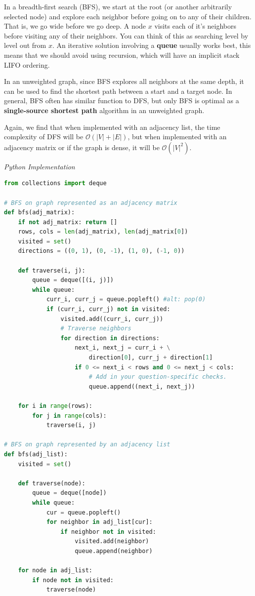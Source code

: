 \documentclass{article}
\newcommand{\bigO}{\mathcal{O}}
\begin{document}
    In a breadth-first search (BFS), we start at the root (or another arbitrarily selected node) and explore each neighbor before going on to any of their children. That is, we go wide before we go deep. A node $x$ visits each of it's neighbors before visiting any of their neighbors. You can think of this as searching level by level out from $x$. An iterative solution involving a \textbf{queue} usually works best, this means that we should avoid using recursion, which will have an implicit stack LIFO ordering.

    In an unweighted graph, since BFS explores all neighbors at the same depth, it can be used to find the shortest path between a start and a target node. In general, BFS often has similar function to DFS, but only BFS is optimal as a \textbf{single-source shortest path} algorithm in an unweighted graph.

    Again, we find that when implemented with an adjacency list, the time complexity of DFS will be $\bigO(|V| + |E|)$, but when implemented with an adjacency matrix or if the graph is dense, it will be $\bigO(|V|^2)$.
    
\vspace{8pt} \emph{Python Implementation}
\begin{lstlisting}[language=Python]
from collections import deque

# BFS on graph represented as an adjacency matrix
def bfs(adj_matrix):
    if not adj_matrix: return []
    rows, cols = len(adj_matrix), len(adj_matrix[0])
    visited = set()
    directions = ((0, 1), (0, -1), (1, 0), (-1, 0))

    def traverse(i, j):
        queue = deque([(i, j)])
        while queue:
            curr_i, curr_j = queue.popleft() #alt: pop(0)
            if (curr_i, curr_j) not in visited:
                visited.add((curr_i, curr_j))
                # Traverse neighbors
                for direction in directions:
                    next_i, next_j = curr_i + \
                        direction[0], curr_j + direction[1]
                    if 0 <= next_i < rows and 0 <= next_j < cols:
                        # Add in your question-specific checks.
                        queue.append((next_i, next_j))

    for i in range(rows):
        for j in range(cols):
            traverse(i, j)
            
# BFS on graph represented by an adjacency list 
def bfs(adj_list):
    visited = set()
    
    def traverse(node):
        queue = deque([node])
        while queue:
            cur = queue.popleft()
            for neighbor in adj_list[cur]:
                if neighbor not in visited:
                    visited.add(neighbor)
                    queue.append(neighbor)
                    
    for node in adj_list:
        if node not in visited:
            traverse(node)
\end{lstlisting}
\end{document}
